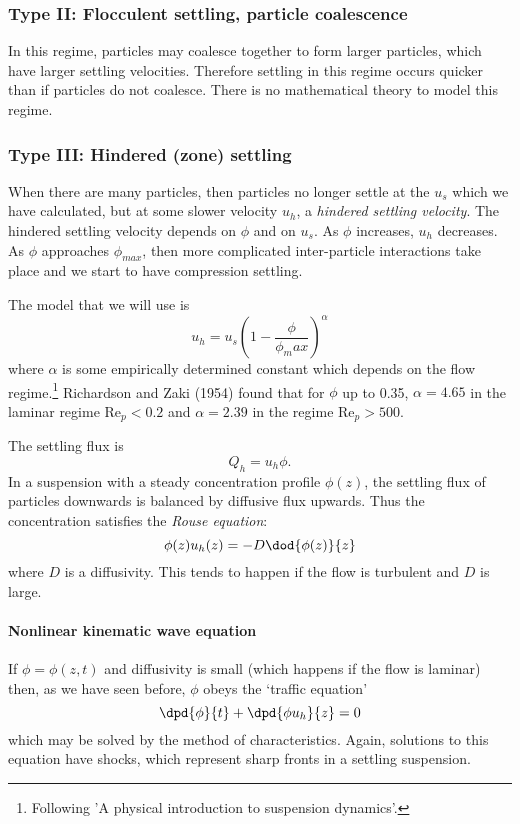 \subsubsection{Type II: Flocculent settling, particle coalescence}

In this regime, particles may coalesce together to form larger particles, which have larger settling velocities. Therefore settling in this regime occurs quicker than if particles do not coalesce. There is no mathematical theory to model this regime.

\subsubsection{Type III: Hindered (zone) settling}

When there are many particles, then particles no longer settle at the $u_s$ which we have calculated, but at some slower velocity $u_h$, a \textit{hindered settling velocity}. The hindered settling velocity depends on $\phi$ and on $u_s$. As $\phi$ increases, $u_h$ decreases. As $\phi$ approaches $\phi_{max}$, then more complicated inter-particle interactions take place and we start to have compression settling. 

The model that we will use is 
\begin{equation}
	u_h = u_s \left( 1 - \frac{\phi}{\phi_max} \right)^\alpha
\end{equation}
where $\alpha$ is some empirically determined constant which depends on the flow regime.\footnote{Following 'A physical introduction to suspension dynamics'.} Richardson and Zaki (1954) found that for $\phi$ up to 0.35, $\alpha = 4.65$ in the laminar regime $\mathrm{Re}_p < 0.2$ and $\alpha = 2.39$ in the regime $\mathrm{Re}_p > 500$. 

The settling flux is
\begin{equation}
	Q_h = u_h \phi.
\end{equation}
In a suspension with a steady concentration profile $\phi(z)$, the settling flux of particles downwards is balanced by diffusive flux upwards. Thus the concentration satisfies the \textit{Rouse equation}:
\begin{equation}
	\phi(z) u_h(z) = -D \dod{\phi(z)}{z}
\end{equation}
where $D$ is a diffusivity. This tends to happen if the flow is turbulent and $D$ is large.

\paragraph{Nonlinear kinematic wave equation}
If $\phi = \phi(z,t)$ and diffusivity is small (which happens if the flow is laminar) then, as we have seen before, $\phi$ obeys the `traffic equation'
\begin{equation}
	\dpd{\phi}{t} + \dpd{\phi u_h}{z} = 0
\end{equation}
which may be solved by the method of characteristics. Again, solutions to this equation have shocks, which represent sharp fronts in a settling suspension.

